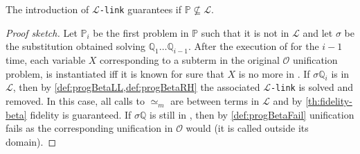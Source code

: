 \documentclass[sigconf,natbib=false,review]{acmart}
\newcommand{\UnifRel}{\ensuremath{\simeq}}
\newcommand{\Ue}{\ensuremath{\UnifRel_m}\xspace}
\newcommand{\llambda}{\ensuremath{\mathcal{L}}\xspace}
\newcommand{\linkMacro}[1]{\ensuremath{#1}\texttt{-link}\xspace}
\newcommand{\linkbeta}{\linkMacro{\llambda}}
\newcommand{\Fo}{\texorpdfstring{\ensuremath{\mathcal{O}}\xspace}{O}}
\newcommand{\foUnifPb}{\ensuremath{\mathbb{P}}\xspace}
\newcommand{\hoUnifPb}{\ensuremath{\mathbb{Q}}\xspace}
\begin{document}
\begin{theorem}[Fidelity in \Fo]
  The introduction of \linkbeta guarantees 
  if $\foUnifPb \not\subseteq \llambda$.
\end{theorem}

\begin{proof}[Proof sketch]
  Let $\foUnifPb_i$ be the first problem in \foUnifPb{} such that it is not in \llambda and let
  $\sigma$ be the substitution obtained solving
  $\hoUnifPb_1\ldots\hoUnifPb_{i-1}$. After the execution of \hstep
  for the $i-1$ time,
  each variable $X$ corresponding to a \maybeeta subterm in the original \Fo 
  unification problem, is instantiated iff it is known for sure
  that $X$ is no more in \maybeeta. If $\sigma\hoUnifPb_i$ is in \llambda, then 
  by \cref{def:progBetaLL,def:progBetaRH} the associated \linkbeta
  is solved and removed. In this case, all
  calls to \Ue{} are between terms in \llambda and by \cref{th:fidelity-beta}
  fidelity is guaranteed. If $\sigma\hoUnifPb$ is still in \notllambda,
  then by \cref{def:progBetaFail} unification fails as the
  corresponding unification in \Fo{} would (it is called outside its domain).
\end{proof}
\end{document}
